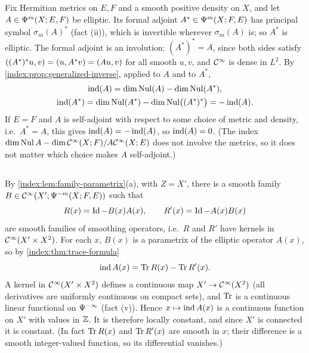 \subsection*{}
Fix Hermitian metrics on $E,F$ and a smooth positive density on $X$, and let
$A\in\Psi^{m}(X;E,F)$ be elliptic. Its formal adjoint $A^*\in\Psi^{m}(X;F,E)$ has
principal symbol $\sigma_m(A)^*$ (fact (ii)), which is invertible wherever
$\sigma_m(A)$ is; so $A^*$ is elliptic. The formal adjoint is an involution:
$(A^*)^*=A$, since both sides satisfy $( (A^*)^*u, v)=( u, A^*v)=( Au, v)$
for all smooth $u,v$, and $\mathcal{C}^\infty$ is dense in $L^2$. By
\cref{index:prop:generalized-inverse}, applied to $A$ and to $A^*$,
\begin{gather*}
  \operatorname{ind}(A)=\dim\operatorname{Nul}(A)-\dim\operatorname{Nul}(A^*),\\
  \operatorname{ind}(A^*)=\dim\operatorname{Nul}(A^*)-\dim\operatorname{Nul}\bigl((A^*)^*\bigr)=-\operatorname{ind}(A).
\end{gather*}
If $E=F$ and $A$ is self-adjoint with respect to some choice of metric and density,
i.e.\ $A^*=A$, this gives $\operatorname{ind}(A)=-\operatorname{ind}(A)$, so $\operatorname{ind}(A)=0$. (The index
$\dim\operatorname{Nul} A-\dim\mathcal{C}^\infty(X;F)/A\mathcal{C}^\infty(X;E)$ does not involve the metrics, so it does not matter
which choice makes $A$ self-adjoint.)

\subsection*{}
By \cref{index:lem:family-parametrix}(a), with $Z=X'$, there is a smooth family
$B\in\mathcal{C}^\infty(X';\Psi^{-m}(X;F,E))$ such that
\begin{equation*}
  R(x)=\operatorname{Id}-B(x)A(x),\qquad R'(x)=\operatorname{Id}-A(x)B(x)
\end{equation*}
are smooth families of smoothing operators, i.e.\ $R$ and $R'$ have kernels in
$\mathcal{C}^\infty(X'\times X^2)$. For each $x$, $B(x)$ is a parametrix of the elliptic operator
$A(x)$, so by \cref{index:thm:trace-formula}
\begin{equation*}
  \operatorname{ind} A(x)=\operatorname{Tr} R(x)-\operatorname{Tr} R'(x).
\end{equation*}
A kernel in $\mathcal{C}^\infty(X'\times X^2)$ defines a continuous map $X'\to\mathcal{C}^\infty(X^2)$ (all
derivatives are uniformly continuous on compact sets), and $\operatorname{Tr}$ is a continuous
linear functional on $\Psi^{-\infty}$ (fact (v)). Hence $x\mapsto\operatorname{ind} A(x)$ is a
continuous function on $X'$ with values in $\mathbb{Z}$. It is therefore locally constant,
and since $X'$ is connected it is constant. (In fact $\operatorname{Tr} R(x)$ and $\operatorname{Tr} R'(x)$ are
smooth in $x$; their difference is a smooth integer-valued function, so its
differential vanishes.)

